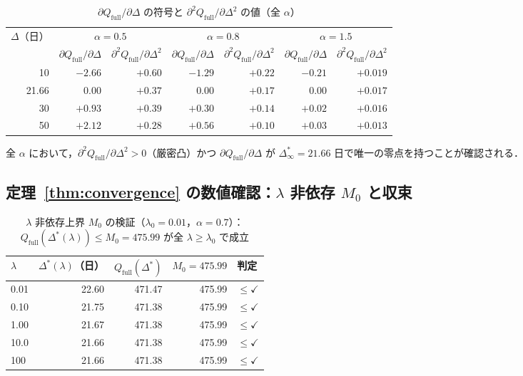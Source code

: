 \documentclass[12pt,a4paper]{article}
\theoremstyle{plain}
\theoremstyle{definition}
\theoremstyle{remark}
\newcommand{\Qf}{Q_{\mathrm{full}}}
\newcommand{\Dopt}{\Delta^{*}}
\newcommand{\Dinf}{\Delta^{*}_{\infty}}
\begin{document}
\begin{table}[h]
\centering
\caption{$\partial\Qf/\partial\Delta$ の符号と $\partial^2\Qf/\partial\Delta^2$ の値（全 $\alpha$）}
\label{tab:dQ}
\begin{tabular}{@{}rrrrrrr@{}}
\toprule
\multirow{2}{*}{$\Delta$（日）} &
\multicolumn{2}{c}{$\alpha=0.5$} &
\multicolumn{2}{c}{$\alpha=0.8$} &
\multicolumn{2}{c}{$\alpha=1.5$} \\
\cmidrule{2-3}\cmidrule{4-5}\cmidrule{6-7}
& $\partial\Qf/\partial\Delta$ & $\partial^2\Qf/\partial\Delta^2$ &
$\partial\Qf/\partial\Delta$ & $\partial^2\Qf/\partial\Delta^2$ &
$\partial\Qf/\partial\Delta$ & $\partial^2\Qf/\partial\Delta^2$ \\
\midrule
10    & $-2.66$ & $+0.60$ & $-1.29$ & $+0.22$ & $-0.21$ & $+0.019$ \\
21.66 & $0.00$  & $+0.37$ & $0.00$  & $+0.17$ & $0.00$  & $+0.017$ \\
30    & $+0.93$ & $+0.39$ & $+0.30$ & $+0.14$ & $+0.02$ & $+0.016$ \\
50    & $+2.12$ & $+0.28$ & $+0.56$ & $+0.10$ & $+0.03$ & $+0.013$ \\
\bottomrule
\end{tabular}
\end{table}

全 $\alpha$ において，$\partial^2\Qf/\partial\Delta^2>0$（厳密凸）かつ $\partial\Qf/\partial\Delta$ が
$\Dinf=21.66$ 日で唯一の零点を持つことが確認される．

\subsection{定理~\ref{thm:convergence} の数値確認：$\lambda$ 非依存 $M_0$ と収束}

\begin{table}[h]
\centering
\caption{$\lambda$ 非依存上界 $M_0$ の検証（$\lambda_0=0.01$，$\alpha=0.7$）：
$\Qf(\Dopt(\lambda))\le M_0=475.99$ が全 $\lambda\ge\lambda_0$ で成立}
\label{tab:compact}
\begin{tabular}{@{}lrrrl@{}}
\toprule
$\lambda$ & $\Dopt(\lambda)$（日）& $\Qf(\Dopt)$ & $M_0=475.99$ & 判定 \\
\midrule
0.01 & 22.60 & 471.47 & 475.99 & $\le\checkmark$ \\
0.10 & 21.75 & 471.38 & 475.99 & $\le\checkmark$ \\
1.00 & 21.67 & 471.38 & 475.99 & $\le\checkmark$ \\
10.0 & 21.66 & 471.38 & 475.99 & $\le\checkmark$ \\
100  & 21.66 & 471.38 & 475.99 & $\le\checkmark$ \\
\bottomrule
\end{tabular}
\end{table}
\end{document}
